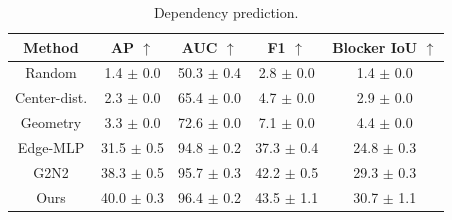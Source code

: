 \begin{table}[htbp]
  \centering
  \caption{Dependency prediction.}
  \label{tab:stage2_prediction_main}
  \small
  \setlength{\tabcolsep}{4.5pt}
  \begin{tabular}{ccccc}
    \toprule
    Method & AP $\uparrow$ & AUC $\uparrow$ & F1 $\uparrow$ & Blocker IoU $\uparrow$ \\
    \midrule
    Random & 1.4 $\pm$ 0.0 & 50.3 $\pm$ 0.4 & 2.8 $\pm$ 0.0 & 1.4 $\pm$ 0.0 \\
    Center-dist. & 2.3 $\pm$ 0.0 & 65.4 $\pm$ 0.0 & 4.7 $\pm$ 0.0 & 2.9 $\pm$ 0.0 \\
    Geometry & 3.3 $\pm$ 0.0 & 72.6 $\pm$ 0.0 & 7.1 $\pm$ 0.0 & 4.4 $\pm$ 0.0 \\
    Edge-MLP & 31.5 $\pm$ 0.5 & 94.8 $\pm$ 0.2 & 37.3 $\pm$ 0.4 & 24.8 $\pm$ 0.3 \\
    G2N2 & 38.3 $\pm$ 0.5 & 95.7 $\pm$ 0.3 & 42.2 $\pm$ 0.5 & 29.3 $\pm$ 0.3 \\
    Ours & 40.0 $\pm$ 0.3 & 96.4 $\pm$ 0.2 & 43.5 $\pm$ 1.1 & 30.7 $\pm$ 1.1 \\
    \bottomrule
  \end{tabular}
\end{table}

